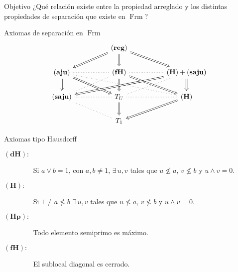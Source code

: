\documentclass[compress,12pt]{beamer}
\DeclareMathOperator{\Frm}{Frm}
\begin{document}
\begin{frame}{Objetivo}
    \Huge{¿Qué relación existe entre la propiedad arreglado y los distintas propiedades de separación que existe en $\Frm$?}

\end{frame}

\begin{frame}{Axiomas de separación en $\Frm$}
    \[\begin{tikzcd}
	&& {\mathbf{(reg)}} \\
	{\mathbf{(aju)}} && {\mathbf{(fH)}} && {\mathbf{(H)}+\mathbf{(saju)}} \\
	{\mathbf{(saju)}} && {T_U} && {\mathbf{(H)}} \\
	&& {T_1}
	\arrow[Rightarrow, from=1-3, to=2-1]
	\arrow[Rightarrow, from=1-3, to=2-3]
	\arrow[Rightarrow, from=1-3, to=2-5]
	\arrow[dotted, no head, from=2-1, to=2-3]
	\arrow[Rightarrow, from=2-1, to=3-1]
	\arrow[Rightarrow, from=2-1, to=3-3]
	\arrow[dotted, no head, from=2-1, to=3-5]
	\arrow[dotted, no head, from=2-3, to=2-5]
	\arrow[dotted, no head, from=2-3, to=3-1]
	\arrow[Rightarrow, from=2-3, to=3-3]
	\arrow[Rightarrow, from=2-3, to=3-5]
	\arrow[Rightarrow, from=2-5, to=3-1]
	\arrow[dotted, no head, from=2-5, to=3-3]
	\arrow[Rightarrow, from=2-5, to=3-5]
	\arrow[dotted, no head, from=3-1, to=3-3]
	\arrow[dotted, no head, from=3-1, to=4-3]
	\arrow[dotted, no head, from=3-3, to=3-5]
	\arrow[Rightarrow, from=3-3, to=4-3]
	\arrow[Rightarrow, from=3-5, to=4-3]
\end{tikzcd}\]
\end{frame}

\begin{frame}{Axiomas tipo Hausdorff}
    \begin{description}
        \item[$\mathbf{(dH):}$]$\quad$ Si $a\vee b=1$, con $a,b\neq 1$, $\exists\, u,v$ tales que $u\nleq a$, $v\nleq b$ y $u\wedge v=0$.
        \item[$\mathbf{(H):}$]$\quad$ Si $1\neq a\nleq b$ $\exists\, u, v$ tales que $u\nleq a$, $v\nleq b$ y $u\wedge v=0$.
        \item[$\mathbf{(Hp):}$]$\quad$ Todo elemento semiprimo es máximo.
        \item[$\mathbf{(fH):}$]$\quad$ El sublocal diagonal es cerrado.
    \end{description}
\end{frame}
\end{document}
